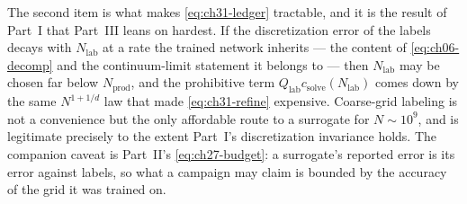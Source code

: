 The second item is what makes \eqref{eq:ch31-ledger} tractable, and it is the result of Part~I
that Part~III leans on hardest. If the discretization error of the labels decays with
$N_{\mathrm{lab}}$ at a rate the trained network inherits --- the content of \eqref{eq:ch06-decomp}
and the continuum-limit statement it belongs to --- then $N_{\mathrm{lab}}$ may be chosen far
below $N_{\mathrm{prod}}$, and the prohibitive term $Q_{\mathrm{lab}} c_{\mathrm{solve}}(N_{\mathrm{lab}})$
comes down by the same $N^{1+1/d}$ law that made \eqref{eq:ch31-refine} expensive. Coarse-grid labeling
is not a convenience but the only affordable route to a surrogate for
$N \sim 10^{9}$, and is legitimate precisely to the extent Part~I's discretization invariance holds. The companion caveat
is Part~II's \eqref{eq:ch27-budget}: a surrogate's reported error is its error against labels, so what
a campaign may claim is bounded by the accuracy of the grid it was trained on.

